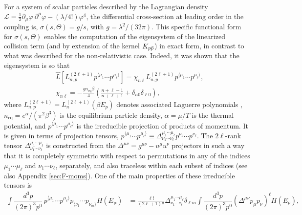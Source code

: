 \documentclass[aps,prd,preprint,nofootinbib,amsmath,amssymb,showpacs,longbibliography,singlecolumn,superscriptaddress,10pt]{revtex4-1}
\theoremstyle{plain}
\theoremstyle{definition}
\begin{document}
For a system of scalar particles described by the Lagrangian density $\mathcal{L} = \frac{1}{2} \partial_{\mu} \varphi \ \partial^{\mu} \varphi
-
(\lambda/4!) \varphi^{4}$, the differential cross-section at leading order in the coupling is, $\sigma(s, \Theta) = g/s$, with $g = \lambda^{2}/(32 \pi)$. This specific functional form for $\sigma(s, \Theta)$ enables the computation of the eigensystem of the linearized collision term (and by extension of the kernel $K_{p \Bar{p}}$) in exact form, in contrast to what was described for the non-relativistic case. Indeed, it was shown that the eigensystem is so that  \cite{Denicol:2022bsq} 
%
\begin{equation}
\label{eq:eigenvalues-lin-col}
\begin{aligned}
&
\hat{L}\left[L^{(2\ell+1)}_{n,p} p^{\langle \mu_{1}} \cdots p^{\mu_{\ell} \rangle} \right] 
=
\chi_{n \ell} 
L^{(2\ell+1)}_{n,p} p^{\langle \mu_{1}} \cdots p^{\mu_{\ell} \rangle},
 \\
&
\chi_{n \ell} = - \frac{g n_{\mathrm{eq}} \beta}{4}  \left(\frac{n+\ell-1}{n+\ell+1} + \delta_{n0}\delta_{\ell 0}\right),
\end{aligned}    
\end{equation}
%
where $L^{(2\ell+1)}_{n,p} = L^{(2\ell+1)}_{n}(\beta E_p)$ denotes associated Laguerre polynomials \cite{NIST:DLMF,gradshteyn2014table}, $n_{\mathrm{eq}} = e^{\alpha}/(\pi^{2} \beta^{3})$ is the equilibrium particle density, $\alpha = \mu/T$ is the thermal potential, and $p^{\langle \mu_{1}} \cdots p^{\mu_{\ell} \rangle}$ is the irreducible projection of products of momentum. It is given in terms of projection tensors, $p^{\langle \mu_{1}} \cdots p^{\mu_{\ell} \rangle} \equiv \Delta^{\mu_{1} \cdots \mu_{\ell}}_{\nu_{1} \cdots \nu_{\ell}} p^{\nu_{1}} \cdots p^{\nu_{\ell}}$. The $2 \ell$-rank tensor $\Delta^{\mu_{1} \cdots \mu_{\ell}}_{\nu_{1} \cdots \nu_{\ell}}$ is constructed from the $\Delta^{\mu \nu} = g^{\mu \nu} - u^{\mu} u^{\nu}$ projectors in such a way that it is completely symmetric with respect to permutations in any of the indices $\mu_{1} \cdots \mu_{\ell}$ and $\nu_{1} \cdots \nu_{\ell}$, separately, and also traceless within each subset of indices \cite{DeGroot:1980dk,Denicol:2021} (see also Appendix \ref{sec:F-moms}).  One of the main properties of these irreducible tensors is 
%
\begin{equation}
\label{eq:main-property-irred-tens}
\begin{aligned}
%
\int \dfrac{d^3 p}{(2\pi)^3 p^0}\,
p^{\langle \mu_{1}} \cdots p^{\mu_{\ell} \rangle}
p_{\langle \nu_{1}} \cdots p_{\nu_{m} \rangle}
H(E_{\mathbf{p}})
& = \frac{\ell!}{(2 \ell + 1)!!} \Delta^{\mu_{1} \cdots \mu_{\ell}}_{\nu_{1} \cdots \nu_{\ell} } \delta_{\ell m} 
\int \dfrac{d^3 p}{(2\pi)^3 p^0}
\left(\Delta^{\mu \nu} p_{\mu} p_{\nu}\right)^{\ell}
H(E_p), 
\end{aligned}
\end{equation}
\end{document}
